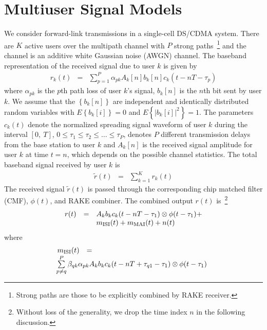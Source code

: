 \documentclass[a4paper,10pt,fleqn, twocolumn]{IEEETran}
\begin{document}
\section{Multiuser Signal Models}
We consider forward-link transmissions in a single-cell DS/CDMA
system. There are $K$ active users over the multipath channel with
$P$ strong paths~\footnote{Strong paths are those to be explicitly
combined by RAKE receiver.} and the channel is an additive white
Gaussian noise (AWGN) channel. The baseband representation of the
received signal due to user $k$ is given by
\begin{equation}
\begin{array}{rcl}
r_k(t)&=&\sum\limits_{p=1}^{P}\alpha_{pk}A_k[n]
b_k[n]c_k(t-nT-\tau_p)
\end{array}
\end{equation}
\noindent where $\alpha_{pk}$ is the $p$th path loss of user $k$'s
signal, $b_k{[n]}$ is the $n$th bit sent by user $k$. We assume
that the $\left\{b_k{[n]}\right\}$ are independent and identically
distributed random variables with $E\left\{b_k{[i]}\right\}=0$ and
$E\left\{|b_k{[i]}|^2\right\}=1$. The parameters $c_k(t)$ denote
the normalized spreading signal waveform of user $k$ during the
interval $[0,\ T]$, $0\leq\tau_1\leq\tau_2\leq\ldots\leq\tau_P$,
denotes $P$ different transmission delays from the base station to
user $k$ and $A_k[n]$ is the received signal amplitude for user
$k$ at time $t=n$, which depends on the possible channel
statistics. The total baseband signal received by user $k$ is
\begin{equation}
\begin{array}{rcl}
\tilde{r}(t)&=&\sum\limits_{k=1}^{K}r_k(t)
\end{array}
\end{equation}
The received signal $\tilde{r}(t)$ is passed through the
corresponding chip matched filter (CMF), $\phi(t)$, and RAKE
combiner. The combined output $r(t)$ is~\footnote{Without loss of
the generality, we drop the time index $n$ in the following
discussion.}
\begin{equation}\hspace{-0.0in}
\begin{array}{rcl}
r(t)&=&A_k b_k c_k(t-nT-\tau_1)\otimes \phi(t-\tau_1)+ \\
&&\hspace{0.0in} m_{\rm ISI}(t) + m_{\rm MAI}(t) + n(t)
\end{array}\label{r_t}
\end{equation}
\noindent where
\begin{equation} \hspace{-0.05in}
\begin{array}{rcl}
 m_{\rm ISI}(t)&=&\\
 &&\hspace{-0.83in}\sum\limits^{P}_{p\neq
q}\beta_{qk} \alpha_{pk}A_kb_kc_k(t-nT+\tau_{q1}-\tau_1)\otimes
\phi(t-\tau_1)
\end{array}
\end{equation}
\end{document}
